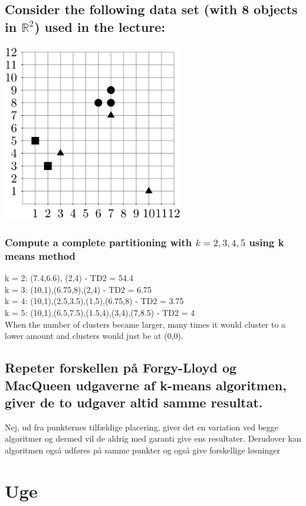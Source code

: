 \documentclass[12pt, a4paper]{article}
\begin{document}
		\subsection{Consider the following data set (with 8 objects in $\mathbb{R}^2$) used in the lecture:}
			\includegraphics[width=300px]{images/43,7.png}
			\subsubsection{Compute a complete partitioning with $k=2,3,4,5$ using k means method}
				k = 2: (7.4,6.6), (2,4) - TD2 = 54.4\\
				k = 3: (10,1),(6.75,8),(2,4) - TD2 = 6.75\\
				k = 4: (10,1),(2.5,3.5),(1,5),(6.75,8) - TD2 = 3.75\\
				k = 5: (10,1),(6.5,7.5),(1.5,4),(3,4),(7,8.5) - TD2 = 4\\
				When the number of clusters became larger, many times it would cluster to a lower amount and clusters would just be at (0,0).
		\subsection{Repeter forskellen på Forgy-Lloyd og MacQueen udgaverne af k-means algoritmen, giver de to udgaver altid samme resultat.}
				Nej, ud fra punkternes tilfældige placering, giver det en variation ved begge algoritmer og dermed vil de aldrig med garanti give ens resultater. Derudover kan algoritmen også udføres på samme punkter og også give forskellige løsninger
	\section{Uge}
\end{document}
